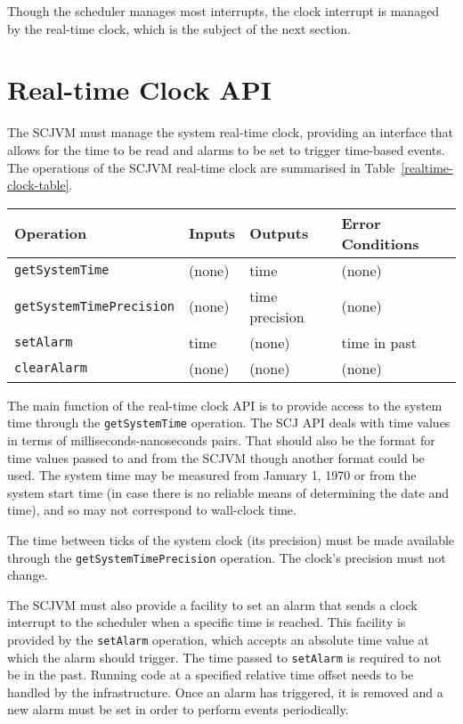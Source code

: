 Though the scheduler manages most interrupts, the clock interrupt is
managed by the real-time clock, which is the subject of the next section.

\section{Real-time Clock API}
\label{realtime-clock-section}

The SCJVM must manage the system real-time clock, providing an
interface that allows for the time to be read and alarms to be set to
trigger time-based events.
The operations of the SCJVM real-time clock are summarised in
Table~\ref{realtime-clock-table}.

\begin{table*}[ht]
  \centering
  \footnotesize
  \begin{tabular}{|l|p{1.2cm}|p{2cm}|p{2.6cm}|}
    Operation & Inputs & Outputs & Error Conditions \\
    \hline
    \texttt{getSystemTime} &
    (none) &
    time &
    (none)
    \\\texttt{getSystemTimePrecision} &
    (none) &
    time precision &
    (none)
    \\\texttt{setAlarm} &
    time &
    (none) &
    time in past
    \\\texttt{clearAlarm} &
    (none) &
    (none) &
    (none)
  \end{tabular}
  \caption{The operations of the SCJVM real-time clock}
  \label{realtime-clock-table}
\end{table*}

The main function of the real-time clock API is to provide access to
the system time through the \texttt{get\-System\-Time} operation.
The SCJ API deals with time values in terms of
milliseconds-nanoseconds pairs.
That should also be the format for time values passed to and from the
SCJVM though another format could be used.
The system time may be measured from January 1, 1970 or from the
system start time (in case there is no reliable means of determining
the date and time), and so may not correspond to wall-clock time.

The time between ticks of the system clock (its precision) must be
made available through the \texttt{get\-System\-Time\-Precision}
operation.
The clock's precision must not change.

The SCJVM must also provide a facility to set an alarm that sends a
clock interrupt to the scheduler when a specific time is reached.
This facility is provided by the \texttt{set\-Alarm} operation, which
accepts an absolute time value at which the alarm should trigger.
The time passed to \texttt{set\-Alarm} is required to not be in the
past.
Running code at a specified relative time offset needs to be handled by
the infrastructure.
Once an alarm has triggered, it is removed and a new alarm must be set
in order to perform events periodically.

